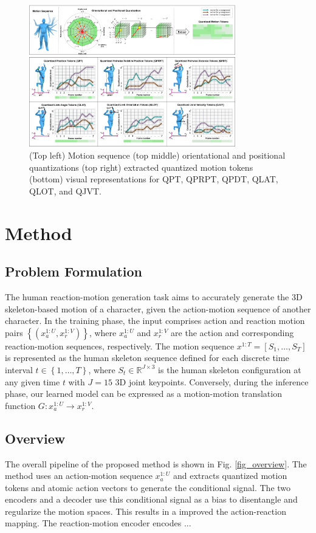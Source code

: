 \begin{figure}	
	\centering
	\includegraphics[width=0.8\textwidth]{figures/chapter4/fig_qmt}
	\caption{(Top left) Motion sequence (top middle) orientational and positional quantizations (top right) extracted quantized motion tokens (bottom) visual representations for QPT, QPRPT, QPDT, QLAT, QLOT, and QJVT.}
	\label{fig_qmt}
\end{figure}

\section{Method}
\subsection{Problem Formulation}
The human reaction-motion generation task aims to accurately generate the 3D skeleton-based motion of a character, given the action-motion sequence of another character. In the training phase, the input comprises action and reaction motion pairs $ \left\lbrace \left( x_a^{1:U},x_r^{1:V}\right) \right\rbrace  $, where $ x_a^{1:U} $ and $ x_r^{1:V} $ are the action and corresponding reaction-motion sequences, respectively. The motion sequence $ x^{1:T}=\left[ S_1,\dots ,S_T\right]  $ is represented as the human skeleton sequence defined for each discrete time interval $t \in \left\lbrace 1,\dots,T\right\rbrace  $, where $ S_t \in \mathbb{R}^{J \times 3} $ is the human skeleton configuration at any given time $ t $ with $ J=15 $ 3D joint keypoints. Conversely, during the inference phase, our learned model can be expressed as a motion-motion translation function $ G: x_a^{1:U} \rightarrow x_r^{1:V} $.

\subsection{Overview}
The overall pipeline of the proposed method is shown in Fig. \ref{fig_overview}. The method uses an action-motion sequence $ x_a^{1:U}$ and extracts quantized motion tokens and atomic action vectors to generate the conditional signal. The two encoders and a decoder use this conditional signal as a bias to disentangle and regularize the motion spaces. This results in a improved the action-reaction mapping. The reaction-motion encoder encodes ...


